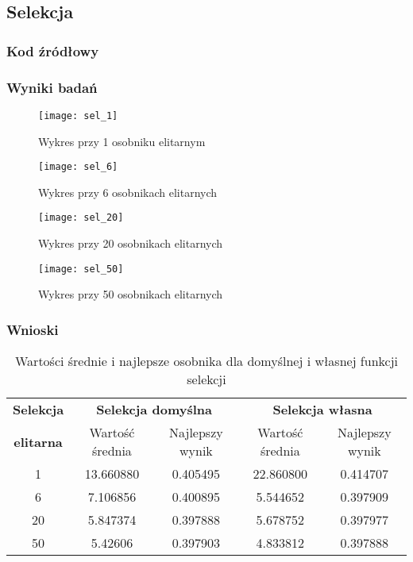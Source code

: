 \subsection{Selekcja}

\subsubsection{Kod źródłowy}


\subsubsection{Wyniki badań}


\begin{figure}[]
	\centering
	\hspace*{-0.8in}
	\texttt{[image: sel\_1]}
	\caption{Wykres przy 1 osobniku elitarnym}  
	\label{rys:sel_1} 
\end{figure}

\begin{figure}[H]
	\centering
	\hspace*{-0.8in}
	\texttt{[image: sel\_6]}
	\caption{Wykres przy 6 osobnikach elitarnych}  
	\label{rys:sel_6} 
\end{figure}

\begin{figure}[H]
	\centering
	\hspace*{-0.8in}
	\texttt{[image: sel\_20]}
	\caption{Wykres przy 20 osobnikach elitarnych}  
	\label{rys:sel_20} 
\end{figure}

\begin{figure}[H]
	\centering
	\hspace*{-0.8in}
	\texttt{[image: sel\_50]}
	\caption{Wykres przy 50 osobnikach elitarnych}  
	\label{rys:sel_50} 
\end{figure}

\subsubsection{Wnioski}

\begin{table}[!h]
	\centering
	\caption{Wartości średnie i najlepsze osobnika dla domyślnej i własnej funkcji selekcji}
	\label{sel_porownanie}
	\begin{tabular}{|c|c|c|c|c|}
		\hline
		\textbf{Selekcja} & \multicolumn{2}{c}{\textbf{Selekcja domyślna}}  & \multicolumn{2}{|c|}{\textbf{Selekcja własna}} \\ \cline{2-5}
		\textbf{elitarna} & Wartość średnia & Najlepszy wynik & Wartość średnia & Najlepszy wynik \\ \hline
		
		1  & 13.660880  & 0.405495 & 22.860800 & 0.414707 \\
		6  & 7.106856 & 0.400895 & 5.544652 & 0.397909 \\
		20 & 5.847374 & 0.397888 & 5.678752 & 0.397977 \\
		50 & 5.42606 & 0.397903 & 4.833812 & 0.397888  \\ \hline      
	\end{tabular}
\end{table}